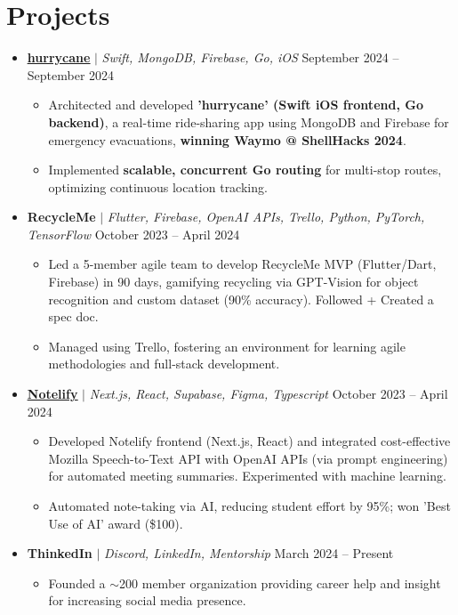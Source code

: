 \documentclass[letterpaper,11pt]{article}
\newcommand{\resumeItem}[1]{
  \item\small{
    {#1 \vspace{-2pt}}
  }
}
\newcommand{\resumeProjectHeading}[2]{
  \item
  \small#1 \hfill #2 \\
  \vspace{-7pt} %
}
\newcommand{\resumeSubHeadingListStart}{\begin{itemize}[leftmargin=0.15in, label={}]}
\newcommand{\resumeSubHeadingListEnd}{\end{itemize}}
\newcommand{\resumeItemListStart}{\begin{itemize}}
\newcommand{\resumeItemListEnd}{\end{itemize}\vspace{-5pt}}
\begin{document}
\section{Projects}
    \resumeSubHeadingListStart
    \resumeProjectHeading
          {\underline{\textbf {\href{https://github.com/keshavbabu/shellhacks/tree/main}{hurrycane}}} $|$ \emph{Swift, MongoDB, Firebase, Go, iOS}}{September 2024 -- September 2024}
          \resumeItemListStart
            \resumeItem{Architected and developed \textbf{'hurrycane' (Swift iOS frontend, Go backend)}, a real-time ride-sharing app using MongoDB and Firebase for emergency evacuations, \textbf{winning Waymo @ ShellHacks 2024}.}
            \resumeItem{Implemented \textbf{scalable, concurrent Go routing} for multi-stop routes, optimizing continuous location tracking.}
          \resumeItemListEnd
      \resumeProjectHeading
          {\textbf{RecycleMe} $|$ \emph{Flutter, Firebase, OpenAI APIs, Trello, Python, PyTorch, TensorFlow}}{October 2023 -- April 2024}
          \resumeItemListStart
            \resumeItem{Led a 5-member agile team to develop RecycleMe MVP (Flutter/Dart, Firebase) in 90 days, gamifying recycling via GPT-Vision for object recognition and custom dataset (90\% accuracy). Followed + Created a spec doc.}
            \resumeItem{Managed using Trello, fostering an environment for learning agile methodologies and full-stack development.}
          \resumeItemListEnd
      \resumeProjectHeading
          {\underline{\textbf {\href{https://www.notelify.co/}{Notelify}}} $|$ \emph{Next.js, React, Supabase, Figma, Typescript}}{October 2023 -- April 2024}
          \resumeItemListStart
            \resumeItem{Developed Notelify frontend (Next.js, React) and integrated cost-effective Mozilla Speech-to-Text API with OpenAI APIs (via prompt engineering) for automated meeting summaries. Experimented with machine learning.}
            \resumeItem{Automated note-taking via AI, reducing student effort by 95\%; won 'Best Use of AI' award (\$100).}
          \resumeItemListEnd
    \resumeProjectHeading
          {\textbf{ThinkedIn} $|$ \emph{Discord, LinkedIn, Mentorship}}{March 2024 -- Present}
          \resumeItemListStart
            \resumeItem{Founded a \(\sim \)200 member organization providing career help and insight for increasing social media presence.}
          \resumeItemListEnd
    \resumeSubHeadingListEnd



%
\end{document}
